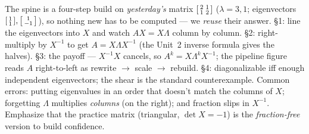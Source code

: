 \documentclass[10pt]{article}
\begin{document}
\begin{teachernote}
The spine is a four-step build on \emph{yesterday's} matrix $\begin{bsmallmatrix}2&1\\1&2\end{bsmallmatrix}$
($\lambda=3,1$; eigenvectors $\begin{bsmallmatrix}1\\1\end{bsmallmatrix},\begin{bsmallmatrix}1\\-1\end{bsmallmatrix}$),
so nothing new has to be computed --- we \emph{reuse} their answer. §1: line the eigenvectors into $X$ and
watch $AX=X\Lambda$ column by column. §2: right-multiply by $X^{-1}$ to get $A=X\Lambda X^{-1}$ (the Unit~2
inverse formula gives the halves). §3: the payoff --- $X^{-1}X$ cancels, so $A^k=X\Lambda^k X^{-1}$; the
pipeline figure reads $A$ right-to-left as rewrite $\to$ scale $\to$ rebuild. §4: diagonalizable iff enough
independent eigenvectors; the shear is the standard counterexample. Common errors: putting eigenvalues in an
order that doesn't match the columns of $X$; forgetting $\Lambda$ multiplies \emph{columns} (on the right);
and fraction slips in $X^{-1}$. Emphasize that the practice matrix (triangular, $\det X=-1$) is the
\emph{fraction-free} version to build confidence.
\end{teachernote}
\end{document}
